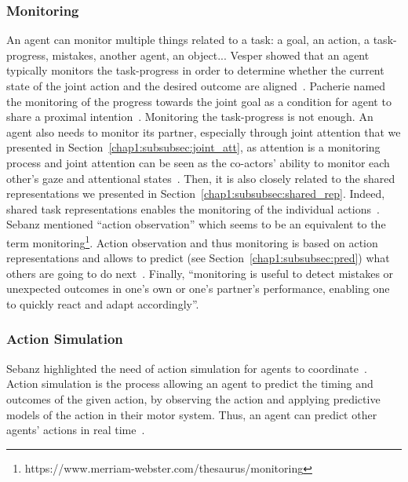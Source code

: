 \documentclass[a4paper,11pt,twoside]{StyleThese}
\begin{document}
\subsubsection{Monitoring}\label{chap1:subsubsec:monitoring}
An agent can monitor multiple things related to a task: a goal, an action, a task-progress, mistakes, another agent, an object... Vesper \etal{} showed that an agent typically monitors the task-progress in order to determine whether the current state of the joint action and the desired outcome are aligned~\cite{vesper_2010_minimal}. Pacherie named the monitoring of the progress towards the joint goal as a condition for agent to share a proximal intention~\cite{pacherie_2012_agency}. Monitoring the task-progress is not enough. An agent also needs to monitor its partner, especially through joint attention that we presented in Section~\ref{chap1:subsubsec:joint_att}, as attention is a monitoring process and joint attention can be seen as the co-actors’ ability to monitor each other’s gaze and attentional states~\cite{emery_2000_eyes}. Then, it is also closely related to the shared representations we presented in Section~\ref{chap1:subsubsec:shared_rep}. Indeed, shared task representations enables the monitoring of the individual actions~\cite{knoblich_2011_joint}. Sebanz \etal{} mentioned ``action observation'' which seems to be an equivalent to the term monitoring\footnote{https://www.merriam-webster.com/thesaurus/monitoring}. Action observation and thus monitoring is based on action representations and allows to predict (see Section~\ref{chap1:subsubsec:pred}) what others are going to do next~\cite{sebanz_2006_joint}. Finally, ``monitoring is useful to detect mistakes or unexpected outcomes in one's own or one's partner's performance, enabling one to quickly react and adapt accordingly''.

\subsubsection{Action Simulation}
Sebanz \etal{} highlighted the need of action simulation for agents to coordinate~\cite{sebanz_2009_prediction,knoblich_2011_joint}. Action simulation is the process allowing an agent to predict the timing and outcomes of the given action, by observing the action and applying predictive models of the action in their motor system. Thus, an agent can predict other agents' actions in real time~\cite{wolpert_2003_unifying}.
\end{document}
